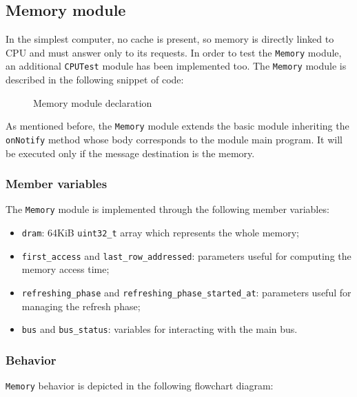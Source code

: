 \documentclass[a4paper,12pt]{article}
\begin{document}
\subsection{Memory module}
In the simplest computer, no cache is present, so memory is directly linked to CPU and must answer only to its requests.
In order to test the \texttt{Memory} module, an additional \texttt{CPUTest} module has been implemented too.
The \texttt{Memory} module is described in the following snippet of code:

\begin{figure}[H]

\caption{Memory module declaration}
\label{src:memory-h}
\end{figure}

As mentioned before, the \texttt{Memory} module extends the basic module inheriting the \texttt{onNotify} method whose body corresponds to the module main program.
It will be executed only if the message destination is the memory.

\subsubsection{Member variables}
The \texttt{Memory} module is implemented through the following member variables:

\begin{itemize}
    \item \texttt{dram}: 64KiB \texttt{uint32\_t} array which represents the whole memory;
    \item \texttt{first\_access} and \texttt{last\_row\_addressed}: parameters useful for computing the memory access time;
    \item \texttt{refreshing\_phase} and \texttt{refreshing\_phase\_started\_at}: parameters useful for managing the refresh phase;
    \item \texttt{bus} and \texttt{bus\_status}: variables for interacting with the main bus.
\end{itemize}

\subsubsection{Behavior}
\texttt{Memory} behavior is depicted in the following flowchart diagram:
\end{document}
